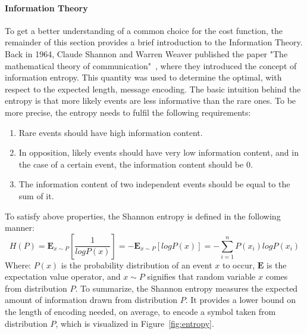 \paragraph{Information Theory} \mbox{}
 
To get a better understanding of a common choice for the cost function, the remainder of this section provides a brief introduction to the Information Theory.
Back in 1964, Claude Shannon and Warren Weaver published the paper "The mathematical theory of communication"~\cite{Shannon}, where they introduced the concept of information entropy. This quantity was used to determine the optimal, with respect to the expected length,  message encoding. The basic intuition behind the entropy is that more likely events are less informative than the rare ones. To be more precise, the entropy needs to fulfil the following requirements:
\begin{enumerate}
\item Rare events should have high information content. 
\item In opposition, likely events should have very low information content, and in the case of a certain event, the information content should be $0$. 
\item The information content of two independent events should be equal to the sum of it. 
\end{enumerate}
To satisfy above properties, the Shannon entropy is defined in the following manner:  
\begin{equation}\label{eq:entropy}
H(P) =\mathbf{E}_{x\sim P}\left[\frac{1}{log P(x)} \right] = - \mathbf{E}_{x\sim P}[log P(x)] = - \sum_{i=1}^{n} P(x_i)log P(x_i)
\end{equation}
Where: $P(x)$ is the probability distribution of an event $x$ to occur, $\mathbf{E}$ is the expectation value operator, and $x \sim P$ signifies that random variable $x$ comes from distribution $P$. To summarize, the Shannon entropy measures the expected amount of information drawn from distribution $P$. It provides a lower bound on the length of encoding needed, on average, to encode a symbol taken from distribution $P$, which is visualized in Figure~\ref{fig:entropy}.

